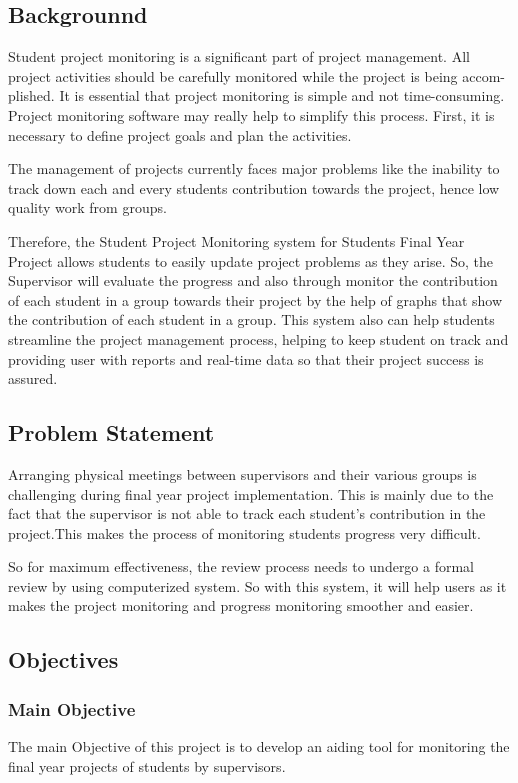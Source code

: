 \documentclass{article}
\begin{document}
\subsection{Backgrounnd}
Student project monitoring is a significant part of project management. All
project activities should be carefully monitored while the project is being accom-
plished. It is essential that project monitoring is simple and not time-consuming.
Project monitoring software may really help to simplify this process. First, it
is necessary to define project goals and plan the activities.
\par The management of projects currently faces major problems like the inability
to track down each and every students contribution towards the project, hence
low quality work from groups.
\par Therefore, the Student Project Monitoring system for Students Final Year
Project allows students to easily update project problems as they arise. So, the
Supervisor will evaluate the progress and also through monitor the contribution
of each student in a group towards their project by the help of graphs that show
the contribution of each student in a group. This system also can help students
streamline the project management process, helping to keep student on track
and providing user with reports and real-time data so that their project success is assured.

\subsection{Problem Statement}
Arranging physical meetings between supervisors and their various groups is
challenging during final year project implementation. This is mainly due to the
fact that the supervisor is not able to track each student's contribution in the
project.This makes the process of monitoring students progress very difficult.
\par So for maximum effectiveness, the review process needs to undergo a formal
review by using computerized system. So with this system, it will help users as
it makes the project monitoring and progress monitoring smoother and easier.
\subsection{Objectives}
\subsubsection{Main Objective}
The main Objective of this project is to develop an aiding tool for monitoring
the final year projects of students by supervisors.
\end{document}
